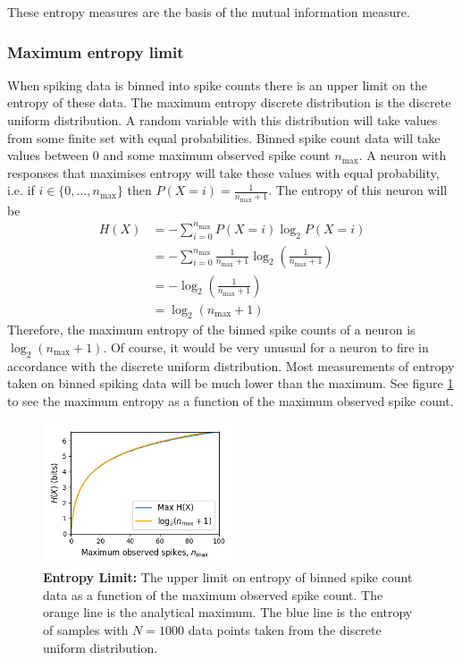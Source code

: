 \documentclass[a4paper,12pt]{article}
\theoremstyle{definition}
\begin{document}
        These entropy measures are the basis of the mutual information measure.

        \subsubsection{Maximum entropy limit}\label{sec:entropy_limit}
        When spiking data is binned into spike counts there is an upper limit on the entropy of these data. The maximum entropy discrete distribution is the discrete uniform distribution. A random variable with this distribution will take values from some finite set with equal probabilities. Binned spike count data will take values between $0$ and some maximum observed spike count $n_{\max}$. A neuron with responses that maximises entropy will take these values with equal probability, i.e. if $i \in \lbrace 0, \dots, n_{\max} \rbrace$ then $P(X = i) = \frac{1}{n_{\max} + 1}$. The entropy of this neuron will be
        \begin{align*}
          H(X)  &= - \sum_{i=0}^{n_{\max}} P(X = i) \log _2 P(X=i) \\
                &= - \sum_{i=0}^{n_{\max}} \frac{1}{n_{\max} + 1} \log_2 \left( \frac{1}{n_{\max} + 1} \right) \\
                &= - \log_2 \left( \frac{1}{n_{\max} + 1} \right) \\
                &= \log_2 \left( n_{\max} + 1 \right)
        \end{align*}
        Therefore, the maximum entropy of the binned spike counts of a neuron is $\log _2 \left( n_{\max} + 1 \right)$. Of course, it would be very unusual for a neuron to fire in accordance with the discrete uniform distribution. Most measurements of entropy taken on binned spiking data will be much lower than the maximum. See figure \ref{fig:entropy_limit} to see the maximum entropy as a function of the maximum observed spike count.

        \begin{figure}[h]
          \centering
          \includegraphics[width=0.5\textwidth]{figures/entropy_limit.png}
          \caption{\textbf{Entropy Limit:} The upper limit on entropy of binned spike count data as a function of the maximum observed spike count. The orange line is the analytical maximum. The blue line is the entropy of samples with $N=1000$ data points taken from the discrete uniform distribution.}
          \label{fig:entropy_limit}
        \end{figure}
\end{document}
